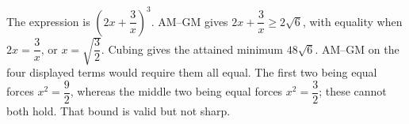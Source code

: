The expression is $(2x+\dfrac{3}{x})^3$. AM--GM gives $2x+\dfrac{3}{x}\ge2\sqrt6$, with equality when $2x=\dfrac{3}{x}$, or $x=\sqrt{\dfrac{3}{2}}$. Cubing gives the attained minimum $\boxed{48\sqrt6}$. AM--GM on the four displayed terms would require them all equal. The first two being equal forces $x^2=\dfrac{9}{2}$, whereas the middle two being equal forces $x^2=\dfrac{3}{2}$; these cannot both hold. That bound is valid but not sharp.
